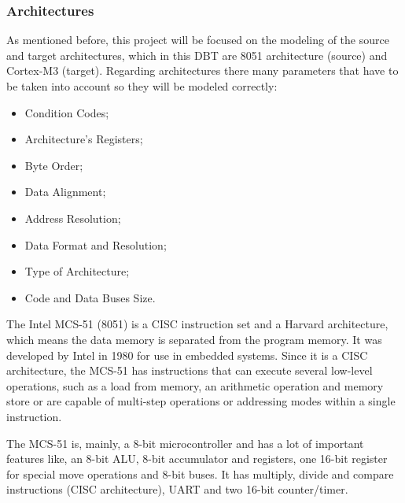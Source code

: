 \subsubsection{Architectures}
\par As mentioned before, this project will be focused on the modeling of the source and target architectures, which in this DBT are 8051 architecture (source) and Cortex-M3 (target). Regarding architectures there many parameters that have to be taken into account so they will be modeled correctly:
\begin{itemize}
	\item Condition Codes;
	\item Architecture's Registers;
	\item Byte Order;
	\item Data Alignment;
	\item Address Resolution;
	\item Data Format and Resolution;
	\item Type of Architecture;
	\item Code and Data Buses Size. 
\end{itemize}

\par The Intel MCS-51 (8051) is a CISC instruction set and a Harvard architecture, which means the data memory is separated from the program memory. It was developed by Intel in 1980 for use in embedded systems. Since it is a CISC architecture, the MCS-51 has instructions that can execute several low-level operations, such as a load from memory, an arithmetic operation and memory store or are capable of multi-step operations or addressing modes within a single instruction.
\par The MCS-51 is, mainly, a 8-bit microcontroller and has a lot of important features like, an 8-bit ALU, 8-bit accumulator and registers, one 16-bit register for special move operations and 8-bit buses. It has multiply, divide and compare instructions (CISC architecture), UART and two 16-bit counter/timer.
